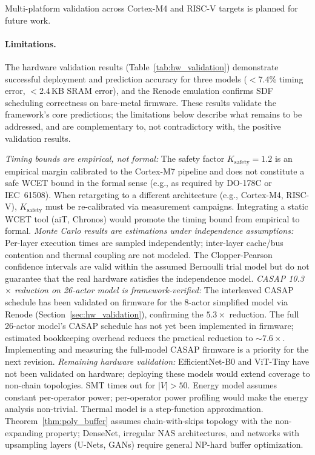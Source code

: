 \documentclass[journal]{IEEEtran}
\begin{document}
Multi-platform validation across Cortex-M4 and RISC-V targets is planned for future work.

\paragraph{Limitations.}
The hardware validation results (Table~\ref{tab:hw_validation}) demonstrate successful deployment and prediction accuracy for three models ($<$7.4\% timing error, $<$2.4\,KB SRAM error), and the Renode emulation confirms SDF scheduling correctness on bare-metal firmware.
These results validate the framework's core predictions; the limitations below describe what remains to be addressed, and are complementary to, not contradictory with, the positive validation results.

\emph{Timing bounds are empirical, not formal:} The safety factor $K_{\mathrm{safety}} = 1.2$ is an empirical margin calibrated to the Cortex-M7 pipeline and does not constitute a safe WCET bound in the formal sense (e.g., as required by DO-178C or IEC~61508). When retargeting to a different architecture (e.g., Cortex-M4, RISC-V), $K_{\mathrm{safety}}$ must be re-calibrated via measurement campaigns. Integrating a static WCET tool (aiT, Chronos) would promote the timing bound from empirical to formal.
\emph{Monte Carlo results are estimations under independence assumptions:} Per-layer execution times are sampled independently; inter-layer cache/bus contention and thermal coupling are not modeled. The Clopper-Pearson confidence intervals are valid within the assumed Bernoulli trial model but do not guarantee that the real hardware satisfies the independence model.
\emph{CASAP 10.3$\times$ reduction on 26-actor model is framework-verified:} The interleaved CASAP schedule has been validated on firmware for the 8-actor simplified model via Renode (Section~\ref{sec:hw_validation}), confirming the $5.3\times$ reduction. The full 26-actor model's CASAP schedule has not yet been implemented in firmware; estimated bookkeeping overhead reduces the practical reduction to ${\sim}7.6\times$. Implementing and measuring the full-model CASAP firmware is a priority for the next revision.
\emph{Remaining hardware validation:} EfficientNet-B0 and ViT-Tiny have not been validated on hardware; deploying these models would extend coverage to non-chain topologies.
SMT times out for $|V| > 50$.
Energy model assumes constant per-operator power; per-operator power profiling would make the energy analysis non-trivial.
Thermal model is a step-function approximation.
Theorem~\ref{thm:poly_buffer} assumes chain-with-skips topology with the non-expanding property; DenseNet, irregular NAS architectures, and networks with upsampling layers (U-Nets, GANs) require general NP-hard buffer optimization.
\end{document}
